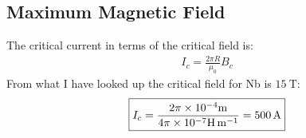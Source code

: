 \documentclass[12pt]{article}
\begin{document}
\subsection{Maximum Magnetic Field}
The critical current in terms of the critical field is:
\begin{align*}
  I_c=\frac{2\pi R}{\mu_0}B_c
\end{align*}
From what I have looked up the critical field for Nb is $\SI{15}{\tesla}$:
\begin{align*}
  \boxed{I_c=\frac{2\pi\times10^{-4}\si{\m}}{4\pi\times10^{-7}\si{\H\per\m}}=
  \SI{500}{\A}}
\end{align*}
\end{document}
